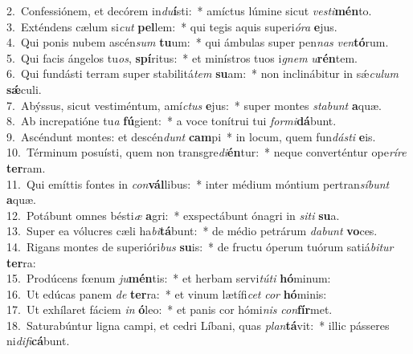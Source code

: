 {2.~}Confessiónem, et decórem in\textit{du}\textbf{í}sti:~* amíctus lúmine sicut \textit{ve}\textit{sti}\textbf{mén}to.\\
{3.~}Exténdens cælum si\textit{cut} \textbf{pel}lem:~* qui tegis aquis superi\textit{ó}\textit{ra} \textbf{e}jus.\\
{4.~}Qui ponis nubem ascén\textit{sum} \textbf{tu}um:~* qui ámbulas super pen\textit{nas} \textit{ven}\textbf{tó}rum.\\
{5.~}Qui facis ángelos tu\textit{os}, \textbf{spí}ritus:~* et minístros tuos i\textit{gnem} \textit{u}\textbf{rén}tem.\\
{6.~}Qui fundásti terram super stabilitá\textit{tem} \textbf{su}am:~* non inclinábitur in sǽ\textit{cu}\textit{lum} \textbf{sǽ}culi.\\
{7.~}Abýssus, sicut vestiméntum, amí\textit{ctus} \textbf{e}jus:~* super montes \textit{sta}\textit{bunt} \textbf{a}quæ.\\
{8.~}Ab increpatióne tu\textit{a} \textbf{fú}gient:~* a voce tonítrui tui \textit{for}\textit{mi}\textbf{dá}bunt.\\
{9.~}Ascéndunt montes: et descén\textit{dunt} \textbf{cam}pi~* in locum, quem fun\textit{dá}\textit{sti} \textbf{e}is.\\
{10.~}Términum posuísti, quem non transgre\textit{di}\textbf{én}tur:~* neque converténtur ope\textit{rí}\textit{re} \textbf{ter}ram.\\
{11.~}Qui emíttis fontes in \textit{con}\textbf{vál}libus:~* inter médium móntium pertran\textit{sí}\textit{bunt} \textbf{a}quæ.\\
{12.~}Potábunt omnes bésti\textit{æ} \textbf{a}gri:~* exspectábunt ónagri in \textit{si}\textit{ti} \textbf{su}a.\\
{13.~}Super ea vólucres cæli ha\textit{bi}\textbf{tá}bunt:~* de médio petrárum \textit{da}\textit{bunt} \textbf{vo}ces.\\
{14.~}Rigans montes de superióri\textit{bus} \textbf{su}is:~* de fructu óperum tuórum satiá\textit{bi}\textit{tur} \textbf{ter}ra:\\
{15.~}Prodúcens fœnum \textit{ju}\textbf{mén}tis:~* et herbam servi\textit{tú}\textit{ti} \textbf{hó}minum:\\
{16.~}Ut edúcas panem \textit{de} \textbf{ter}ra:~* et vinum lætífi\textit{cet} \textit{cor} \textbf{hó}minis:\\
{17.~}Ut exhílaret fáciem \textit{in} \textbf{ó}leo:~* et panis cor hómi\textit{nis} \textit{con}\textbf{fír}met.\\
{18.~}Saturabúntur ligna campi, et cedri Líbani, quas \textit{plan}\textbf{tá}vit:~* illic pásseres ni\textit{di}\textit{fi}\textbf{cá}bunt.\\
